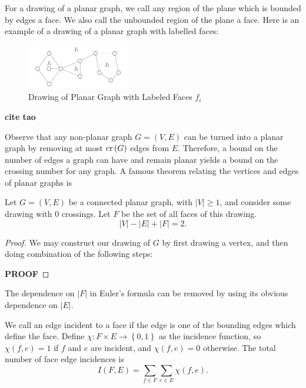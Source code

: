 \documentclass[12pt,reqno]{amsart}
\begin{document}
For a drawing of a planar graph, we call any region of the plane which is bounded by edges a face. We also call
the unbounded region of the plane a face. Here is an example of a drawing of a planar
graph with labelled faces:

\begin{figure}[h]
    \centering
    \includegraphics[width=0.4\textwidth]{faceimage.png}
    \caption{Drawing of Planar Graph with Labeled Faces \(f_{i} \)}
\end{figure}

\textbf{cite tao }

Observe that any non-planar graph \(G = (V,E)\) can be turned into a planar graph by removing at most
\(\operatorname{cr}\left( G \right) \) edges from \(E\). Therefore, a bound on the number of
edges a graph can have and remain planar yields a bound on the crossing number for any graph.
A famous theorem relating the vertices and edges of planar graphs is

\begin{theorem}\label{thm:euler-formula-graphs}
Let \(G = (V,E)\) be a connected planar graph, with \(\left\lvert V \right\rvert \geq 1\), and consider some drawing with 0 crossings.
Let \(F\) be the set of all faces of this drawing.
\[
    \left\lvert V \right\rvert - \left\lvert E \right\rvert + \left\lvert F \right\rvert = 2
.\]
\end{theorem}

\begin{proof}
We may construct our drawing of \(G\) by first drawing a vertex, and then doing combination of the following steps: 

\textbf{PROOF}
\end{proof}

The dependence on \(\left\lvert F \right\rvert \) in Euler's formula can be removed by using
its obvious dependence on \(\left\lvert E \right\rvert \). 

We call an edge incident to a face if the edge is one of the bounding edges which define the face. 
Define \(\chi : F \times E \to \left\{ 0,1 \right\} \) as the incidence function, so
\(\chi(f,e) = 1\) if \(f\) and \(e\) are incident, and \(\chi(f,e) = 0\) otherwise.
The total number of face edge incidences is
\[
    I(F,E) = \sum_{f\in F} \sum _{e \in E} \chi(f,e)
.\]
\end{document}
